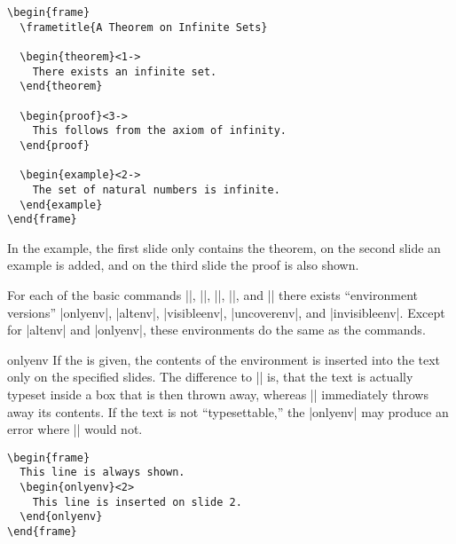 \begin{verbatim}
\begin{frame}
  \frametitle{A Theorem on Infinite Sets}

  \begin{theorem}<1->
    There exists an infinite set.
  \end{theorem}

  \begin{proof}<3->
    This follows from the axiom of infinity.
  \end{proof}

  \begin{example}<2->
    The set of natural numbers is infinite.
  \end{example}
\end{frame}
\end{verbatim}
In the example, the first slide only contains the theorem, on the
second slide an example is added, and on the third slide the proof is
also shown.

For each of the basic commands |\only|, |\alt|, |\visible|,
|\uncover|, and |\invisible| there exists
``environment versions'' |onlyenv|, |altenv|, |visibleenv|,
|uncoverenv|, and |invisibleenv|. Except for |altenv|
and |onlyenv|, these environments do the same as the commands.

\begin{environment}{{onlyenv}}
  If the  is given, the contents of the
  environment is inserted into the text only on the specified
  slides. The difference to |\only| is, that the text is actually
  typeset inside a box that is then thrown away, whereas |\only|
  immediately throws away its contents. If the text is not
  ``typesettable,'' the |onlyenv| may produce an error where |\only|
  would not.
  \example
\begin{verbatim}
\begin{frame}
  This line is always shown.
  \begin{onlyenv}<2>
    This line is inserted on slide 2.
  \end{onlyenv}
\end{frame}
\end{verbatim}
\end{environment}


